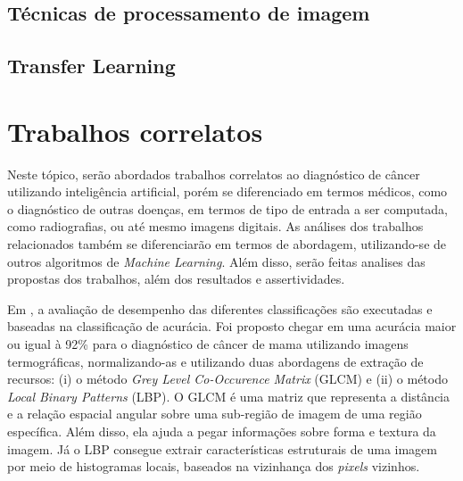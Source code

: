 
\subsection{Técnicas de processamento de imagem}

\subsection{Transfer Learning}






\section{\esp Trabalhos correlatos} %
%

Neste tópico, serão abordados trabalhos correlatos ao diagnóstico de câncer utilizando inteligência artificial, porém se diferenciado em termos médicos, como o diagnóstico de outras doenças, em termos de tipo de entrada a ser computada, como radiografias, ou até mesmo imagens digitais. As análises dos trabalhos relacionados também se diferenciarão em termos de abordagem, utilizando-se de outros algoritmos de \textit{Machine Learning}. Além disso, serão feitas analises das propostas dos trabalhos, além dos resultados e assertividades.


Em , a avaliação de desempenho das diferentes classificações são executadas e baseadas na classificação de acurácia. Foi proposto chegar em uma acurácia maior ou igual à 92\% para o diagnóstico de câncer de mama utilizando imagens termográficas, normalizando-as e utilizando duas abordagens de extração de recursos: (i) o método \textit{Grey Level Co-Occurence Matrix} (GLCM) e (ii) o método \textit{Local Binary Patterns} (LBP). O GLCM é uma matriz que representa a distância e a relação espacial angular sobre uma sub-região de imagem de uma região específica. Além disso, ela ajuda a pegar informações sobre forma e textura da imagem. Já o LBP consegue extrair características estruturais de uma imagem por meio de histogramas locais, baseados na vizinhança dos \textit{pixels} vizinhos.

